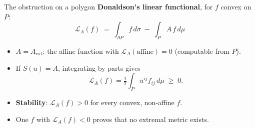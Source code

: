 \documentclass[aspectratio=169,11pt]{beamer}
\newcommand{\Lfun}{\mathcal{L}}
\newcommand{\Aext}{A_{\mathrm{ext}}}
\newcommand{\hl}[1]{\textcolor{accent}{#1}}
\begin{document}

\begin{frame}{The obstruction on a polygon}
  \textbf{Donaldson's linear functional}, for $f$ convex on $P$:
  \[
    \Lfun_A(f) \;=\; \int_{\partial P} f\,d\sigma \;-\; \int_P A\,f\,d\mu
  \]
  \begin{itemize}
    \item $A = \Aext$: the affine function with $\Lfun_A(\text{affine}) = 0$ (computable from $P$).
    \item If $S(u) = A$, integrating by parts gives
      \[ \Lfun_A(f) = \tfrac12\int_P u^{ij} f_{ij}\,d\mu \;\ge\; 0 . \]
    \item \textbf{Stability}: $\Lfun_A(f) > 0$ for every convex, non-affine $f$.
    \item One $f$ with $\Lfun_A(f) < 0$ \hl{proves that no extremal metric exists.}
  \end{itemize}
\end{frame}
\end{document}
